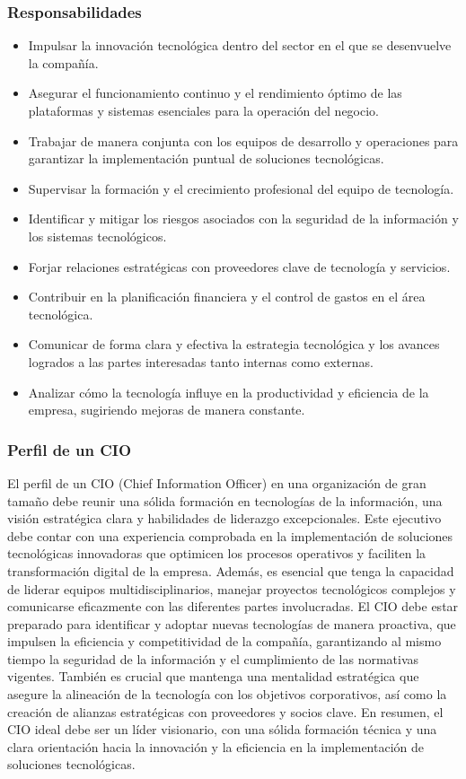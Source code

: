     \subsubsection{Responsabilidades }
        \begin{itemize}
            \item Impulsar la innovación tecnológica dentro del sector en el que se desenvuelve la compañía. 
            \item Asegurar el funcionamiento continuo y el rendimiento óptimo de las plataformas y sistemas esenciales para la operación del negocio. 
            \item Trabajar de manera conjunta con los equipos de desarrollo y operaciones para garantizar la implementación puntual de soluciones tecnológicas. 
            \item Supervisar la formación y el crecimiento profesional del equipo de tecnología. 
            \item Identificar y mitigar los riesgos asociados con la seguridad de la información y los sistemas tecnológicos. 
            \item Forjar relaciones estratégicas con proveedores clave de tecnología y servicios. 
            \item Contribuir en la planificación financiera y el control de gastos en el área tecnológica. 
            \item Comunicar de forma clara y efectiva la estrategia tecnológica y los avances logrados a las partes interesadas tanto internas como externas. 
            \item Analizar cómo la tecnología influye en la productividad y eficiencia de la empresa, sugiriendo mejoras de manera constante. 
        \end{itemize}

    \subsubsection{Perfil de un CIO}
    El perfil de un CIO (Chief Information Officer) en una organización de gran tamaño debe reunir una sólida formación en tecnologías de la información, una visión estratégica clara y habilidades de liderazgo excepcionales. Este ejecutivo debe contar con una experiencia comprobada en la implementación de soluciones tecnológicas innovadoras que optimicen los procesos operativos y faciliten la transformación digital de la empresa. Además, es esencial que tenga la capacidad de liderar equipos multidisciplinarios, manejar proyectos tecnológicos complejos y comunicarse eficazmente con las diferentes partes involucradas. 
    El CIO debe estar preparado para identificar y adoptar nuevas tecnologías de manera proactiva, que impulsen la eficiencia y competitividad de la compañía, garantizando al mismo tiempo la seguridad de la información y el cumplimiento de las normativas vigentes. También es crucial que mantenga una mentalidad estratégica que asegure la alineación de la tecnología con los objetivos corporativos, así como la creación de alianzas estratégicas con proveedores y socios clave. En resumen, el CIO ideal debe ser un líder visionario, con una sólida formación técnica y una clara orientación hacia la innovación y la eficiencia en la implementación de soluciones tecnológicas. 

